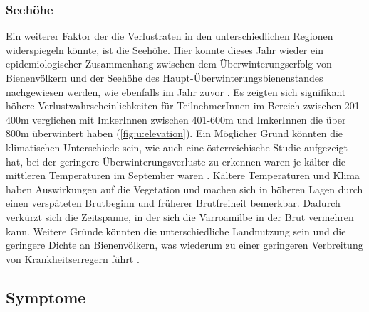 \subsubsection{Seehöhe}

Ein weiterer Faktor der die Verlustraten in den unterschiedlichen Regionen widerspiegeln könnte, ist die Seehöhe. Hier konnte dieses Jahr wieder ein epidemiologischer Zusammenhang zwischen dem Überwinterungserfolg von Bienenvölkern und der Seehöhe des Haupt-Überwinterungsbienenstandes nachgewiesen werden, wie ebenfalls im Jahr zuvor \citep{oberreiter2020}. Es zeigten sich signifikant höhere Verlustwahrscheinlichkeiten für TeilnehmerInnen im Bereich zwischen 201-400\si{\meter} verglichen mit ImkerInnen zwischen 401-600\si{\meter} und ImkerInnen die über 800\si{\meter} überwintert haben (\cref{fig:u:elevation}).
\newline
Ein Möglicher Grund könnten die klimatischen Unterschiede sein, wie auch eine österreichische Studie aufgezeigt hat, bei der geringere Überwinterungsverluste zu erkennen waren je kälter die mittleren Temperaturen im September waren \citep{switanek2017}. Kältere Temperaturen und Klima haben Auswirkungen auf die Vegetation und machen sich in höheren Lagen durch einen verspäteten Brutbeginn und früherer Brutfreiheit bemerkbar. Dadurch verkürzt sich die Zeitspanne, in der sich die Varroamilbe in der Brut vermehren kann. Weitere Gründe könnten die unterschiedliche Landnutzung sein \citep{kuchling2018} und die geringere Dichte an Bienenvölkern, was wiederum zu einer geringeren Verbreitung von Krankheitserregern führt \citep{fries2001, seeley2015, forfert2016, dynes2019}. 

\subsection{Symptome}


